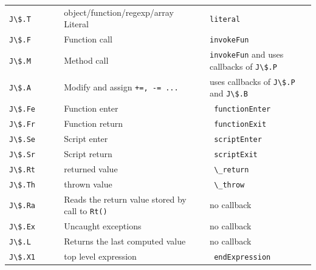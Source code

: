 \begin{table}[h]
{\begin{tabular}{l|l|l}
		{\lstinline|J\$.T           |} & object/function/regexp/array Literal                  &\lstinline|literal |                                \\
		{\lstinline|J\$.F           |} & Function call                                         &\lstinline|invokeFun|                               \\
    {\lstinline|J\$.M           |} & Method call                                           &\lstinline|invokeFun| and uses callbacks of {\lstinline|J\$.P|}   \\
		{\lstinline|J\$.A           |} & Modify and assign \lstinline|+=, -= ...|                          & uses callbacks of \lstinline|J\$.P| and \lstinline|J\$.B|       \\
		{\lstinline|J\$.Fe          |} & Function enter                                        &\lstinline| functionEnter |                          \\
		{\lstinline|J\$.Fr          |} & Function return                                       &\lstinline| functionExit  |                          \\
		{\lstinline|J\$.Se          |} & Script enter                                          &\lstinline| scriptEnter   |                          \\
		{\lstinline|J\$.Sr          |} & Script return                                         &\lstinline| scriptExit    |                          \\
		{\lstinline|J\$.Rt          |} & returned value                                        &\lstinline| \_return      |                          \\
		{\lstinline|J\$.Th          |} & thrown value                                          &\lstinline| \_throw       |                          \\
		{\lstinline|J\$.Ra          |} & Reads the return value stored by call to \lstinline|Rt()|         & no callback                             \\
		{\lstinline|J\$.Ex          |} & Uncaught exceptions                                   & no callback                             \\
		{\lstinline|J\$.L           |} & Returns the last computed value                       & no callback                             \\
		{\lstinline|J\$.X1          |} & top level expression                                  &\lstinline| endExpression               |            \\

\end{tabular}}
\end{table}
